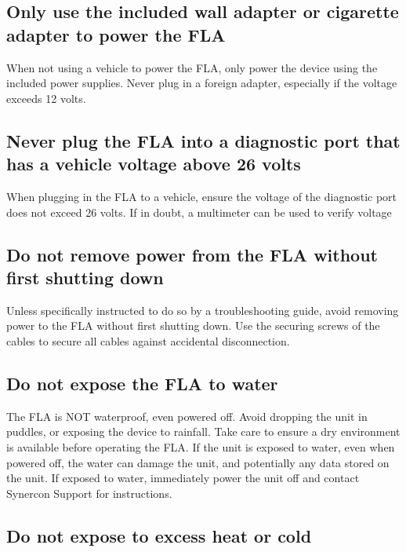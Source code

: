 \documentclass[11pt, oneside]{book}
\begin{document}


\subsection*{Only use the included wall adapter or cigarette adapter to power
the FLA}

When not using a vehicle to power the FLA, only power the device using
the included power supplies. Never plug in a foreign adapter, especially
if the voltage exceeds 12 volts.


\subsection*{Never plug the FLA into a diagnostic port that has a vehicle voltage
above 26 volts}

When plugging in the FLA to a vehicle, ensure the voltage of the diagnostic
port does not exceed 26 volts. If in doubt, a multimeter can be used
to verify voltage


\subsection*{Do not remove power from the FLA without first shutting down}

Unless specifically instructed to do so by a troubleshooting guide,
avoid removing power to the FLA without first shutting down. Use the
securing screws of the cables to secure all cables against accidental
disconnection.


\subsection*{Do not expose the FLA to water}

The FLA is NOT waterproof, even powered off. Avoid dropping the unit
in puddles, or exposing the device to rainfall. Take care to ensure
a dry environment is available before operating the FLA. If the unit
is exposed to water, even when powered off, the water can damage the
unit, and potentially any data stored on the unit. If exposed to water,
immediately power the unit off and contact Synercon Support for instructions.


\subsection*{Do not expose to excess heat or cold}
\end{document}
